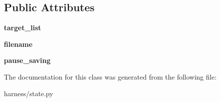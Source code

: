 \subsection*{Public Attributes}
\begin{DoxyCompactItemize}
\item 
\mbox{\label{classharness_1_1state_1_1_target_adapter_a299bab08e7b67848b632cb42fbb76db8}} 
{\bfseries target\+\_\+list}
\item 
\mbox{\label{classharness_1_1state_1_1_target_adapter_ad10de2c57d947335fa91f923b49a60ac}} 
{\bfseries filename}
\item 
\mbox{\label{classharness_1_1state_1_1_target_adapter_ab95750dc6e6bf35c40e9dbdb9eadb601}} 
{\bfseries pause\+\_\+saving}
\end{DoxyCompactItemize}


The documentation for this class was generated from the following file\+:\begin{DoxyCompactItemize}
\item 
harness/state.\+py\end{DoxyCompactItemize}
